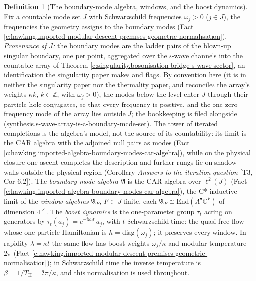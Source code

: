 \documentclass[11pt]{article}
\theoremstyle{definition}
\newtheorem{definition}[theorem]{Definition}
\theoremstyle{plain}
\newcommand{\changedmark}[2]{\marginpar{\raggedright\scriptsize\color{#1}#2}}
\providecommand{\C}{}\renewcommand{\C}{\mathbb{C}}
\providecommand{\End}{}\renewcommand{\End}{\mathrm{End}}
\providecommand{\TH}{}\renewcommand{\TH}{T_{\mathrm{H}}}
\begin{document}
\begin{definition}[The boundary-mode algebra, windows, and the boost dynamics]\label{c:obj.hawking.boundary-mode-algebra-windows-boost-dynamics}
\changedmark{BurntOrange}{changed since the deposit}
Fix a countable mode set $J$ with Schwarzschild frequencies $\omega_j > 0$ ($j \in J$), the frequencies the geometry assigns to the boundary modes (Fact \ref{c:hawking.imported-modular-descent-premises-geometric-normalisation}). \emph{Provenance of $J$:} the boundary modes are the ladder pairs of the blown-up singular boundary, one per point, aggregated over the s-wave channels into the countable array of Theorem \ref{c:singularity.bosonisation-bridge-s-wave-sector}, an identification the singularity paper makes and flags. By convention here (it is in neither the singularity paper nor the thermality paper, and reconciles the array's weights $\kappa k$, $k \in \mathbb{Z}$, with $\omega_j > 0$), the modes below the level enter $J$ through their particle-hole conjugates, so that every frequency is positive, and the one zero-frequency mode of the array lies outside $J$; the bookkeeping is filed alongside (synthesis.s-wave-array-is-a-boundary-mode-set). The tower of iterated completions is the algebra's model, not the source of its countability: its limit is the CAR algebra with the adjoined null pairs as modes (Fact \ref{c:hawking.imported-algebra-boundary-modes-car-algebra}), while on the physical closure one ascent completes the description and further rungs lie on shadow walls outside the physical region (Corollary \emph{Answers to the iteration question} [T3, Cor 6.2]). The \emph{boundary-mode algebra} $\mathfrak{A}$ is the CAR algebra over $\ell^2(J)$ (Fact \ref{c:hawking.imported-algebra-boundary-modes-car-algebra}), the C*-inductive limit of the \emph{window algebras} $\mathfrak{A}_F$, $F \subset J$ finite, each $\mathfrak{A}_F \cong \End(\Lambda^\bullet \C^F)$ of dimension $4^{|F|}$. The \emph{boost dynamics} is the one-parameter group $\tau_t$ acting on generators by $\tau_t(a_j) = e^{-i\omega_j t}\,a_j$, with $t$ Schwarzschild time: the quasi-free flow whose one-particle Hamiltonian is $h = \mathrm{diag}(\omega_j)$; it preserves every window. In rapidity $\lambda = \kappa t$ the same flow has boost weights $\omega_j/\kappa$ and modular temperature $2\pi$ (Fact \ref{c:hawking.imported-modular-descent-premises-geometric-normalisation}); in Schwarzschild time the inverse temperature is $\beta = 1/\TH = 2\pi/\kappa$, and this normalisation is used throughout.
\end{definition}
\end{document}
